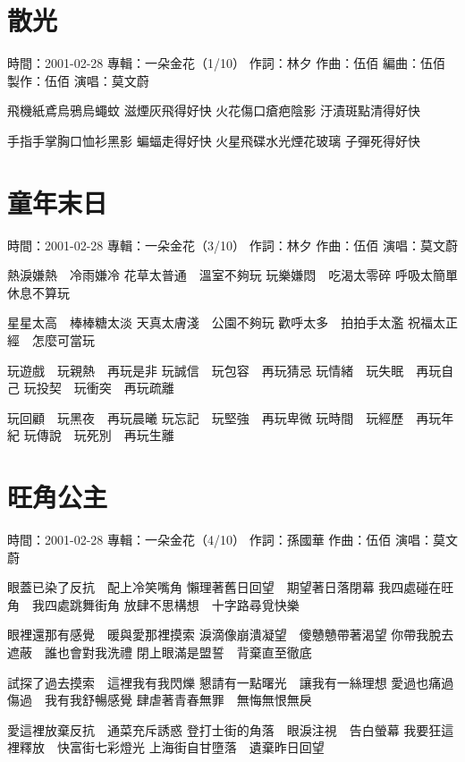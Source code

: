 \documentclass[UTF8,a4paper,oneside,twocolumn,12pt]{ctexbook}
\newcommand{\infopair}[2]{\textbullet #1：#2}
\newcommand{\zc}[1][伍佰]{\infopair{作詞}{#1}}
\newcommand{\zq}[1][伍佰]{\infopair{作曲}{#1}}
\newcommand{\bq}[1][伍佰]{\infopair{編曲}{#1}}
\newcommand{\zj}[1]{\infopair{專輯}{#1}}
\newcommand{\zz}[1]{\infopair{製作}{#1}}
\newcommand{\sj}[1]{\infopair{時間}{#1}}
\newenvironment{info}{\begin{flushleft}\kaishu
	}
	{\end{flushleft}\normalsize\yahei\par}
\newenvironment{lyric}{
	}
{}
\begin{document}
\section{散光}
\begin{info}
	\sj{2001-02-28}
	\zj{一朵金花（1/10）}
	\zc[林夕]
	\zq
	\bq[伍佰]
	\zz{伍佰}
	\infopair{演唱}{莫文蔚}
\end{info}
\begin{lyric}
	飛機紙鳶烏鴉烏蠅蚊 滋煙灰飛得好快
	火花傷口瘡疤陰影 汙漬斑點清得好快

	手指手掌胸口恤衫黑影 蝙蝠走得好快
	火星飛碟水光煙花玻璃 子彈死得好快
\end{lyric}

\section{童年末日}
\begin{info}
	\sj{2001-02-28}
	\zj{一朵金花（3/10）}
	\zc[林夕]
	\zq
	\infopair{演唱}{莫文蔚}
\end{info}
\begin{lyric}
	熱淚嫌熱　冷雨嫌冷
	花草太普通　溫室不夠玩
	玩樂嫌悶　吃渴太零碎
	呼吸太簡單　休息不算玩

	星星太高　棒棒糖太淡
	天真太膚淺　公園不夠玩
	歡呼太多　拍拍手太濫
	祝福太正經　怎麼可當玩

	玩遊戲　玩親熱　再玩是非
	玩誠信　玩包容　再玩猜忌
	玩情緒　玩失眠　再玩自己
	玩投契　玩衝突　再玩疏離

	玩回顧　玩黑夜　再玩晨曦
	玩忘記　玩堅強　再玩卑微
	玩時間　玩經歷　再玩年紀
	玩傳說　玩死別　再玩生離
\end{lyric}

\section{旺角公主}
\begin{info}
	\sj{2001-02-28}
	\zj{一朵金花（4/10）}
	\zc[孫國華]
	\zq
	\infopair{演唱}{莫文蔚}
\end{info}
\begin{lyric}
	眼蓋已染了反抗　配上冷笑嘴角
	懶理著舊日回望　期望著日落閉幕
	我四處碰在旺角　我四處跳舞街角
	放肆不思構想　十字路尋覓快樂

	眼裡還那有感覺　暖與愛那裡摸索
	淚滴像崩潰凝望　傻戇戇帶著渴望
	你帶我脫去遮蔽　誰也會對我洗禮
	閉上眼滿是盟誓　背棄直至徹底

	試探了過去摸索　這裡我有我閃爍
	懇請有一點曙光　讓我有一絲理想
	愛過也痛過傷過　我有我舒暢感覺
	肆虐著青春無罪　無悔無恨無戾

	愛這裡放棄反抗　通菜充斥誘惑
	登打士街的角落　眼淚注視　告白螢幕
	我要狂這裡釋放　快富街七彩燈光
	上海街自甘墮落　遺棄昨日回望
\end{lyric}
\end{document}
